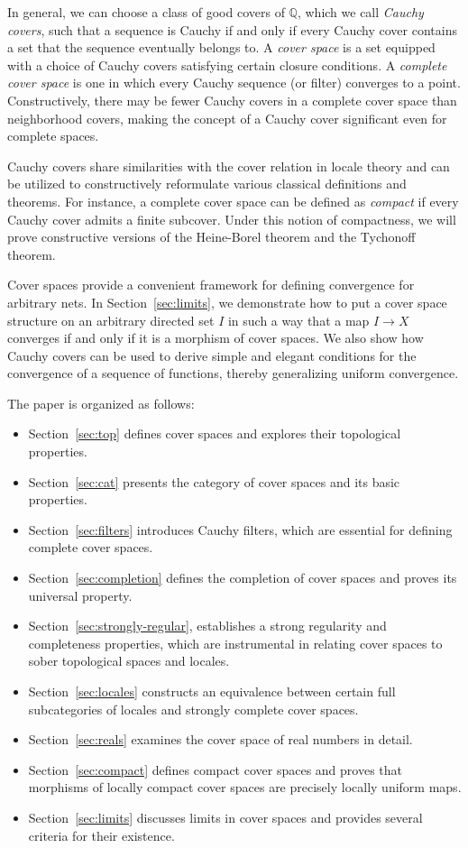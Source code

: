 \documentclass[pdflatex,sn-mathphys-num]{sn-jnl}
\theoremstyle{definition}
\theoremstyle{remark}
\numberwithin{figure}{section}
\begin{document}
In general, we can choose a class of good covers of $\mathbb{Q}$, which we call \emph{Cauchy covers},
such that a sequence is Cauchy if and only if every Cauchy cover contains a set that the sequence eventually belongs to.
A \emph{cover space} is a set equipped with a choice of Cauchy covers satisfying certain closure conditions.
A \emph{complete cover space} is one in which every Cauchy sequence (or filter) converges to a point.
Constructively, there may be fewer Cauchy covers in a complete cover space than neighborhood covers, making the concept of a Cauchy cover significant even for complete spaces.

Cauchy covers share similarities with the cover relation in locale theory and can be utilized to constructively reformulate various classical definitions and theorems.
For instance, a complete cover space can be defined as \emph{compact} if every Cauchy cover admits a finite subcover.
Under this notion of compactness, we will prove constructive versions of the Heine-Borel theorem and the Tychonoff theorem.

Cover spaces provide a convenient framework for defining convergence for arbitrary nets.
In Section~\ref{sec:limits}, we demonstrate how to put a cover space structure on an arbitrary directed set $I$ in such a way that a map $I \to X$ converges if and only if it is a morphism of cover spaces.
We also show how Cauchy covers can be used to derive simple and elegant conditions for the convergence of a sequence of functions, thereby generalizing uniform convergence.

The paper is organized as follows:
\begin{itemize}
\item Section~\ref{sec:top} defines cover spaces and explores their topological properties.
\item Section~\ref{sec:cat} presents the category of cover spaces and its basic properties.
\item Section~\ref{sec:filters} introduces Cauchy filters, which are essential for defining complete cover spaces.
\item Section~\ref{sec:completion} defines the completion of cover spaces and proves its universal property.
\item Section~\ref{sec:strongly-regular}, establishes a strong regularity and completeness properties, which are instrumental in relating cover spaces to sober topological spaces and locales.
\item Section~\ref{sec:locales} constructs an equivalence between certain full subcategories of locales and strongly complete cover spaces.
\item Section~\ref{sec:reals} examines the cover space of real numbers in detail.
\item Section~\ref{sec:compact} defines compact cover spaces and proves that morphisms of locally compact cover spaces are precisely locally uniform maps.
\item Section~\ref{sec:limits} discusses limits in cover spaces and provides several criteria for their existence.
\end{itemize}
\end{document}
